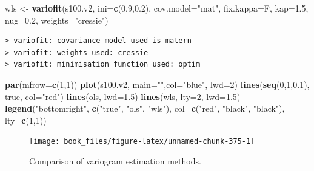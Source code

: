 \documentclass[b5paper,]{scrbook}
\makeatletter
\newenvironment{Shaded}{\begin{snugshade}}{\end{snugshade}}
\newcommand{\DataTypeTok}[1]{\textcolor[rgb]{0.13,0.29,0.53}{#1}}
\newcommand{\DecValTok}[1]{\textcolor[rgb]{0.00,0.00,0.81}{#1}}
\newcommand{\FloatTok}[1]{\textcolor[rgb]{0.00,0.00,0.81}{#1}}
\newcommand{\KeywordTok}[1]{\textcolor[rgb]{0.13,0.29,0.53}{\textbf{#1}}}
\newcommand{\NormalTok}[1]{#1}
\newcommand{\StringTok}[1]{\textcolor[rgb]{0.31,0.60,0.02}{#1}}
\theoremstyle{plain}
\theoremstyle{definition}
\numberwithin{equation}{section}
\newenvironment{kframe}{%
\medskip{}
\setlength{\fboxsep}{.8em}
 \def\at@end@of@kframe{}%
 \ifinner\ifhmode%
  \def\at@end@of@kframe{\end{minipage}}%
  \begin{minipage}{\columnwidth}%
 \fi\fi%
 \def\FrameCommand##1{\hskip\@totalleftmargin \hskip-\fboxsep
 \colorbox{shadecolor}{##1}\hskip-\fboxsep
     \hskip-\linewidth \hskip-\@totalleftmargin \hskip\columnwidth}%
 \MakeFramed {\advance\hsize-\width
   \@totalleftmargin\z@ \linewidth\hsize
   \@setminipage}}%
 {\par\unskip\endMakeFramed%
 \at@end@of@kframe}
\renewenvironment{Shaded}{\begin{kframe}}{\end{kframe}}
\makeatother
\begin{document}
\begin{Shaded}
\begin{Highlighting}[]
\NormalTok{wls <-}\StringTok{ }\KeywordTok{variofit}\NormalTok{(s100.v2, }\DataTypeTok{ini=}\KeywordTok{c}\NormalTok{(}\FloatTok{0.9}\NormalTok{,}\FloatTok{0.2}\NormalTok{), }\DataTypeTok{cov.model=}\StringTok{"mat"}\NormalTok{,}
                \DataTypeTok{fix.kappa=}\NormalTok{F, }\DataTypeTok{kap=}\FloatTok{1.5}\NormalTok{, }\DataTypeTok{nug=}\FloatTok{0.2}\NormalTok{, }\DataTypeTok{weights=}\StringTok{"cressie"}\NormalTok{)}
\end{Highlighting}
\end{Shaded}

\begin{verbatim}
> variofit: covariance model used is matern 
> variofit: weights used: cressie 
> variofit: minimisation function used: optim
\end{verbatim}

\begin{Shaded}
\begin{Highlighting}[]
\KeywordTok{par}\NormalTok{(}\DataTypeTok{mfrow=}\KeywordTok{c}\NormalTok{(}\DecValTok{1}\NormalTok{,}\DecValTok{1}\NormalTok{))}
\KeywordTok{plot}\NormalTok{(s100.v2, }\DataTypeTok{main=}\StringTok{""}\NormalTok{,}\DataTypeTok{col=}\StringTok{"blue"}\NormalTok{, }\DataTypeTok{lwd=}\DecValTok{2}\NormalTok{)}
\KeywordTok{lines}\NormalTok{(}\KeywordTok{seq}\NormalTok{(}\DecValTok{0}\NormalTok{,}\DecValTok{1}\NormalTok{,}\FloatTok{0.1}\NormalTok{), true, }\DataTypeTok{col=}\StringTok{"red"}\NormalTok{)}
\KeywordTok{lines}\NormalTok{(ols, }\DataTypeTok{lwd=}\FloatTok{1.5}\NormalTok{)}
\KeywordTok{lines}\NormalTok{(wls, }\DataTypeTok{lty=}\DecValTok{2}\NormalTok{, }\DataTypeTok{lwd=}\FloatTok{1.5}\NormalTok{)}
\KeywordTok{legend}\NormalTok{(}\StringTok{"bottomright"}\NormalTok{, }\KeywordTok{c}\NormalTok{(}\StringTok{"true"}\NormalTok{, }\StringTok{"ols"}\NormalTok{, }\StringTok{"wls"}\NormalTok{),}
       \DataTypeTok{col=}\KeywordTok{c}\NormalTok{(}\StringTok{"red"}\NormalTok{, }\StringTok{"black"}\NormalTok{, }\StringTok{"black"}\NormalTok{), }\DataTypeTok{lty=}\KeywordTok{c}\NormalTok{(}\DecValTok{1}\NormalTok{,}\DecValTok{1}\NormalTok{))}
\end{Highlighting}
\end{Shaded}

\begin{figure}

{\centering \texttt{[image: book\_files/figure-latex/unnamed-chunk-375-1]} 

}

\caption{Comparison of variogram estimation methods.}\label{fig:unnamed-chunk-375}
\end{figure}
\end{document}

